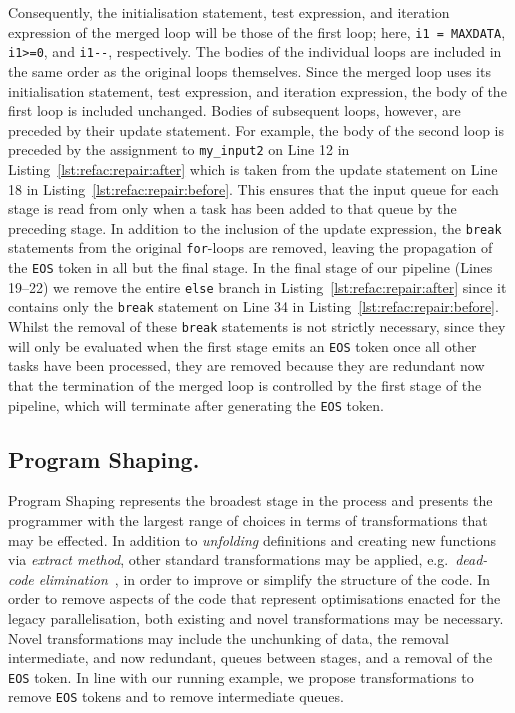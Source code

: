 %
Consequently, the initialisation statement, test expression, and iteration expression of the merged loop will be those of the first loop; here, \lstinline|i1 = MAXDATA|, \lstinline|i1>=0|, and \lstinline|i1--|, respectively.
%
The bodies of the individual loops are included in the same order as the original loops themselves. Since the merged loop uses its initialisation statement, test expression, and iteration expression, the body of the first loop is included unchanged.
%
Bodies of subsequent loops, however, are preceded by their update statement. For example, the body of the second loop is preceded by the assignment to \lstinline|my_input2| on Line 12 in Listing~\ref{lst:refac:repair:after} which is taken from the update statement on Line 18 in Listing~\ref{lst:refac:repair:before}. This ensures that the input queue for each stage is read from only when a task has been added to that queue by the preceding stage.
%
In addition to the inclusion of the update expression, the \lstinline|break| statements from the original \lstinline|for|-loops are removed, leaving the propagation of the \lstinline{EOS}  token in all but the final stage. In the final stage of our pipeline (Lines 19--22) we remove the entire \lstinline|else| branch in Listing~\ref{lst:refac:repair:after} since it contains only the \lstinline|break| statement on Line 34 in Listing~\ref{lst:refac:repair:before}. Whilst the removal of these \lstinline|break| statements is not strictly necessary, since they will only be evaluated when the first stage emits an \lstinline{EOS}  token once all other tasks have been processed, they are removed because they are redundant now that the termination of the merged loop is controlled by the first stage of the pipeline, which will terminate after generating the \lstinline{EOS}  token.

\subsection{Program Shaping.}
\label{sec:refac:shaping}

Program Shaping represents the broadest stage in the process and presents the programmer with the largest range of choices in terms of transformations that may be effected. In addition to \emph{unfolding} definitions and creating new functions via \emph{extract method}, other standard transformations may be applied, e.g.\ \emph{dead-code elimination}~\cite{Kennedy:DeadCodeElimination}, in order to improve or simplify the structure of the code. In order to remove aspects of the code that represent optimisations enacted for the legacy parallelisation, both existing and novel transformations may be necessary. Novel transformations may include the unchunking of data, the removal intermediate, and now redundant, queues between stages, and a removal of the \lstinline{EOS}  token. In line with our running example, we propose transformations to remove \lstinline{EOS}  tokens and to remove intermediate queues.

